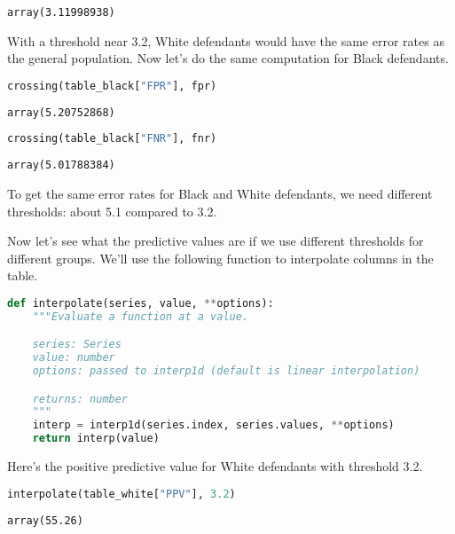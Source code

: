 \begin{lstlisting}[style=output]
array(3.11998938)
\end{lstlisting}

With a threshold near 3.2, White defendants would have the same error
rates as the general population. Now let's do the same computation for
Black defendants.

\begin{lstlisting}[language=Python,style=source]
crossing(table_black["FPR"], fpr)
\end{lstlisting}

\begin{lstlisting}[style=output]
array(5.20752868)
\end{lstlisting}

\begin{lstlisting}[language=Python,style=source]
crossing(table_black["FNR"], fnr)
\end{lstlisting}

\begin{lstlisting}[style=output]
array(5.01788384)
\end{lstlisting}

To get the same error rates for Black and White defendants, we need
different thresholds: about 5.1 compared to 3.2.

Now let's see what the predictive values are if we use different
thresholds for different groups. We'll use the following function to
interpolate columns in the table.

\begin{lstlisting}[language=Python,style=source]
def interpolate(series, value, **options):
    """Evaluate a function at a value.

    series: Series
    value: number
    options: passed to interp1d (default is linear interpolation)

    returns: number
    """
    interp = interp1d(series.index, series.values, **options)
    return interp(value)
\end{lstlisting}

Here's the positive predictive value for White defendants with threshold
3.2.

\begin{lstlisting}[language=Python,style=source]
interpolate(table_white["PPV"], 3.2)
\end{lstlisting}

\begin{lstlisting}[style=output]
array(55.26)
\end{lstlisting}

